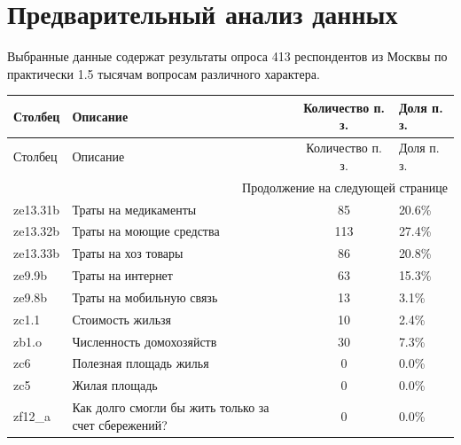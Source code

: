 \documentclass[12pt]{report}
\begin{document}
\section{Предварительный анализ данных}
Выбранные данные содержат результаты опроса 413 респондентов из Москвы по практически 1.5 тысячам вопросам различного характера. 
\begin{longtable}{llcl}
  \toprule
   Столбец &                                                                                             Описание &  Количество п. з. & Доля п. з. \\
  \midrule
  \endfirsthead
  
  \toprule
   Столбец &                                                                                             Описание &  Количество п. з. & Доля п. з. \\
  \midrule
  \endhead
  \midrule
  \multicolumn{4}{r}{{Продолжение на следующей странице }} \\
  \midrule
  \endfoot
  
  \bottomrule
  \endlastfoot
  ze13.31b &       Траты на медикаменты &                               85 &                     20.6\% \\
  ze13.32b & Траты на моющие средства &                              113 &                     27.4\% \\
  ze13.33b & Траты на хоз товары &                               86 &                     20.8\% \\
    ze9.9b & Траты на интернет &                               63 &                     15.3\% \\
    ze9.8b &                        Траты на мобильную связь &                               13 &                      3.1\% \\
     zc1.1 &                                  Стоимость жильзя &                               10 &                      2.4\% \\
     zb1.o &                                          Численность домохозяйств &                               30 &                      7.3\% \\
       zc6 & Полезная площадь жилья &                                0 &                      0.0\% \\
       zc5 & Жилая площадь &                                0 &                      0.0\% \\
    zf12\_a & Как долго смогли бы жить только за счет сбережений?  &                                0 &                      0.0\% \\
  \end{longtable}
\end{document}
